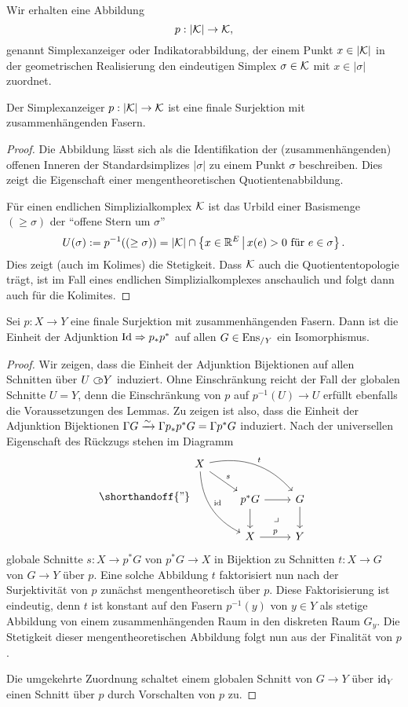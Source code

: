 Wir erhalten eine Abbildung
\[ p: |\mathcal{K}| \to \mathcal{K}, \]
genannt Simplexanzeiger oder Indikatorabbildung, der einem Punkt $x
\in |\mathcal{K}|$ in der geometrischen Realisierung den eindeutigen Simplex
$\sigma \in \mathcal{K}$ mit $x \in |\sigma|$ zuordnet.

\begin{lemma}
  Der Simplexanzeiger $p: |\mathcal{K}| \to \mathcal{K}$ ist eine finale Surjektion mit
  zu\-sam\-men\-hän\-gen\-den Fasern.
\end{lemma}
\begin{proof}
  Die Abbildung lässt sich als die Identifikation der
  (zusammenhängenden) offenen Inneren der Standardsimplizes $|\sigma|$
  zu einem Punkt $\sigma$ beschreiben. Dies zeigt die Eigenschaft
  einer mengentheoretischen Quotientenabbildung.

  Für einen endlichen Simplizialkomplex $\mathcal{K}$ ist das Urbild einer
  Basismenge $(\geq \sigma)$ der ``offene Stern um $\sigma$''
  \[ U(\sigma) := p^{-1}((\geq \sigma))
  = |\mathcal{K}| \cap \left\{ x \in \mathbb{R}^E \,\middle|\, x(e) > 0 \text{ für } e \in \sigma  \right\}.
  \]
  Dies zeigt (auch im Kolimes) die Stetigkeit. Dass $\mathcal{K}$ auch die
  Quotiententopologie trägt, ist im Fall eines endlichen
  Simplizialkomplexes anschaulich und folgt dann auch für die
  Kolimites.
\end{proof}
\begin{lemma}[\cite{TG}, 4.3.22] \label{final-pullback}
  Sei $p: X \to Y$ eine finale Surjektion mit zusammenhängenden
  Fasern. Dann ist die Einheit der Adjunktion $\operatorname{Id} \Rightarrow p_* p^*$ auf
  allen $G \in \operatorname{Ens}_{/Y}$ ein Isomorphismus.
\end{lemma}
\begin{proof}
  Wir zeigen, dass die Einheit der Adjunktion Bijektionen auf allen
  Schnitten über $U \subset\kern-0.58em\circ Y$ induziert. Ohne Einschränkung reicht der
  Fall der globalen Schnitte $U = Y$, denn die Einschränkung von $p$
  auf $p^{-1}(U) \to U$ erfüllt ebenfalls die Voraussetzungen des
  Lemmas. Zu zeigen ist also, dass die Einheit der Adjunktion
  Bijektionen $\Gamma G \xrightarrow[]{\sim} \Gamma p_* p^* G = \Gamma p^* G$
  induziert. Nach der universellen Eigenschaft des Rückzugs stehen im
  Diagramm
  \[
  \shorthandoff{"}
  \begin{tikzcd}
    X \arrow[ddr, bend right, "\id"]
    \arrow[drr, bend left,"t"] \arrow[dr, "s"] & & \\
    & p^* G \rar \dar \arrow[dr, phantom, "\lrcorner"]
    & G \dar \\
    & X \rar{p}
    & Y
  \end{tikzcd}
  \]
  globale Schnitte $s: X \to p^* G$ von $p^* G \to X$ in Bijektion zu
  Schnitten $t: X \to G$ von $G \to Y$ über $p$. Eine solche Abbildung
  $t$ faktorisiert nun nach der Surjektivität von $p$ zunächst
  mengentheoretisch über $p$. Diese Faktorisierung ist eindeutig, denn
  $t$ ist konstant auf den Fasern $p^{-1}(y)$ von $y \in Y$ als
  stetige Abbildung von einem zusammenhängenden Raum in den diskreten
  Raum $G_y$. Die Stetigkeit dieser mengentheoretischen Abbildung
  folgt nun aus der Finalität von $p$.

  Die umgekehrte Zuordnung schaltet einem globalen Schnitt von $G \to
  Y$ über $\operatorname{id}_Y$ einen Schnitt über $p$ durch Vorschalten von $p$ zu.
\end{proof}
